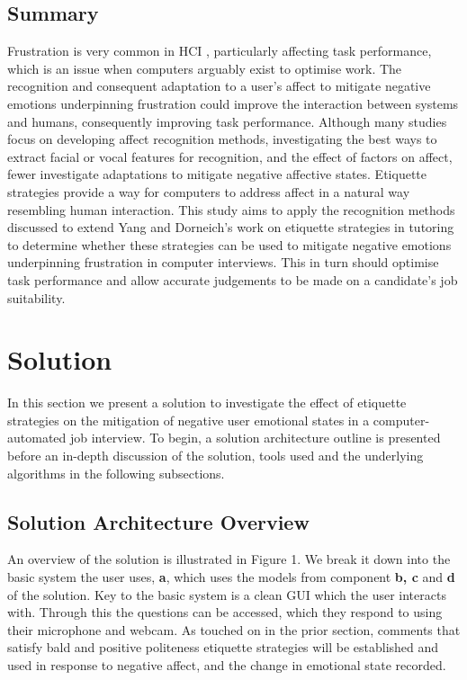 \documentclass[12pt,a4paper]{article}
\begin{document}
\subsection{Summary}
Frustration is very common in HCI \cite{ceaparu2004determining}, particularly affecting task performance, which is an issue when computers arguably exist to optimise work. The recognition and consequent adaptation to a user's affect to mitigate negative emotions underpinning frustration could improve the interaction between systems and humans, consequently improving task performance. Although many studies focus on developing affect recognition methods, investigating the best ways to extract facial or vocal features for recognition, and the effect of factors on affect, fewer investigate adaptations to mitigate negative affective states. Etiquette strategies provide a way for computers to address affect in a natural way resembling human interaction. This study aims to apply the recognition methods discussed to extend Yang and Dorneich's work on etiquette strategies in tutoring \cite{yang2018evaluating} to determine whether these strategies can be used to mitigate negative emotions underpinning frustration in computer interviews. This in turn should optimise task performance and allow accurate judgements to be made on a candidate's job suitability.


\section{Solution}
In this section we present a solution to investigate the effect of etiquette strategies on the mitigation of negative user emotional states in a computer-automated job interview. To begin, a solution architecture outline is presented before an in-depth discussion of the solution, tools used and the underlying algorithms in the following subsections.

\subsection{Solution Architecture Overview}
An overview of the solution is illustrated in Figure 1. We break it down into the basic system the user uses, \textbf{a}, which uses the models from component \textbf{b, c} and \textbf{d} of the solution. Key to the basic system is a clean GUI which the user interacts with. Through this the questions can be accessed, which they respond to using their microphone and webcam. As touched on in the prior section, comments that satisfy bald and positive politeness etiquette strategies will be established and used in response to negative affect, and the change in emotional state recorded.
\end{document}

